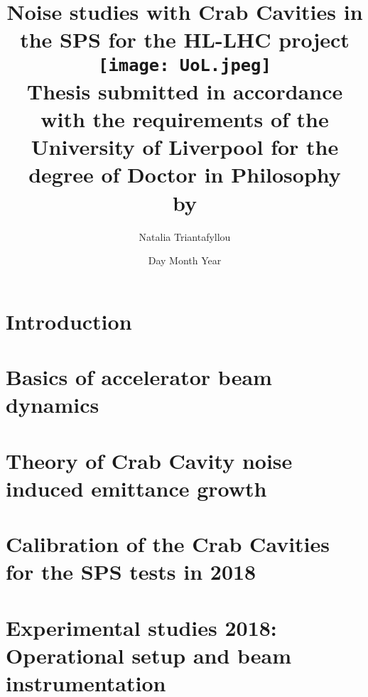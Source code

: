 \documentclass[12pt,twoside]{report} %
\begin{document}
\frontmatter
\title{
{Noise studies with Crab Cavities in the SPS for the HL-LHC project}\\
{\texttt{[image: UoL.jpeg]}} \\
{\large Thesis submitted in accordance with the requirements of the University of Liverpool for the degree of Doctor in Philosophy \\ by}
}
\author{ Natalia Triantafyllou}
\date{Day Month Year}
\maketitle
\newpage




\listoffigures
{}
\listoftables
{}

\newpage

\thispagestyle{plain} %

\listofsymbols
{}

\tableofcontents

\mainmatter

\chapter{Introduction}


\chapter{Basics of accelerator beam dynamics}


\chapter{Theory of Crab Cavity noise induced emittance growth}\label{Ch:CC_noise_theory}


\chapter{Calibration of the Crab Cavities for the SPS tests in 2018}\label{Ch:CC_set_up}


\chapter{Experimental studies 2018: Operational setup and beam instrumentation}\label{Ch:2018_setup}

\end{document}
